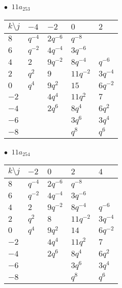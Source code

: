 \begin{minipage}{\linewidth}
$\bullet\ $ $11a_{253}$ \vspace{0.5em} \\
\begin{tabular}{l|llll}
$k \setminus j$ & $-4$ & $-2$ & $0$ & $2$ \\
\hline
$8$ & $q^{-4}$ & $2q^{-6}$ & $q^{-8}$ &  \\
$6$ & $q^{-2}$ & $4q^{-4}$ & $3q^{-6}$ &  \\
$4$ & $2$ & $9q^{-2}$ & $8q^{-4}$ & $q^{-6}$ \\
$2$ & $q^{2}$ & $9$ & $11q^{-2}$ & $3q^{-4}$ \\
$0$ & $q^{4}$ & $9q^{2}$ & $15$ & $6q^{-2}$ \\
$-2$ &  & $4q^{4}$ & $11q^{2}$ & $7$ \\
$-4$ &  & $2q^{6}$ & $8q^{4}$ & $6q^{2}$ \\
$-6$ &  &  & $3q^{6}$ & $3q^{4}$ \\
$-8$ &  &  & $q^{8}$ & $q^{6}$ \\
\end{tabular}
\vspace{2em}
\end{minipage}
%
\begin{minipage}{\linewidth}
$\bullet\ $ $11a_{254}$ \vspace{0.5em} \\
\begin{tabular}{l|llll}
$k \setminus j$ & $-2$ & $0$ & $2$ & $4$ \\
\hline
$8$ & $q^{-4}$ & $2q^{-6}$ & $q^{-8}$ &  \\
$6$ & $q^{-2}$ & $4q^{-4}$ & $3q^{-6}$ &  \\
$4$ & $2$ & $9q^{-2}$ & $8q^{-4}$ & $q^{-6}$ \\
$2$ & $q^{2}$ & $8$ & $11q^{-2}$ & $3q^{-4}$ \\
$0$ & $q^{4}$ & $9q^{2}$ & $14$ & $6q^{-2}$ \\
$-2$ &  & $4q^{4}$ & $11q^{2}$ & $7$ \\
$-4$ &  & $2q^{6}$ & $8q^{4}$ & $6q^{2}$ \\
$-6$ &  &  & $3q^{6}$ & $3q^{4}$ \\
$-8$ &  &  & $q^{8}$ & $q^{6}$ \\
\end{tabular}
\vspace{2em}
\end{minipage}
%

